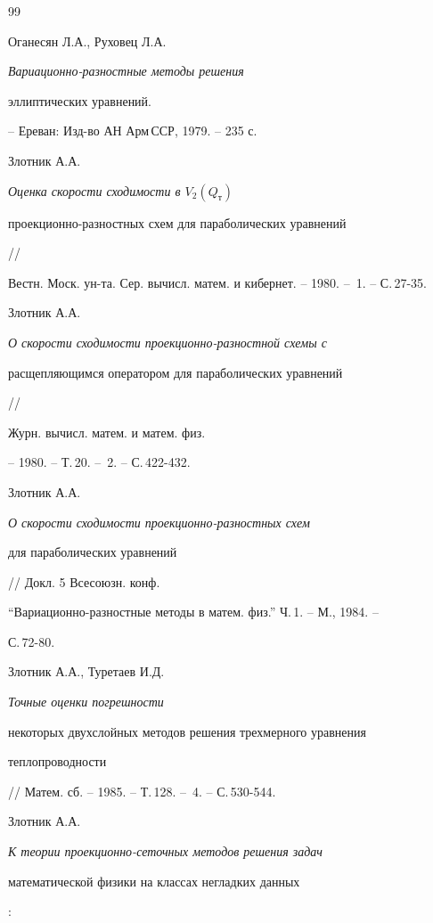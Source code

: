 \begin{thebibliography}{99}


Оганесян Л.А., Руховец Л.А. {\em Вариационно-разностные методы решения


эллиптических уравнений.} -- Ереван: Изд-во АН Арм\,ССР, 1979. -- 235 с.







Злотник А.А. {\em Оценка скорости сходимости  в $V_2(Q_{\text{т}})$ 


проекционно-разностных схем для параболических уравнений} //


Вестн. Моск. ун-та. Сер. вычисл. матем. и кибернет. -- 1980. -- \No\,1. -- С.\,27-35.







Злотник А.А. {\em О скорости сходимости проекционно-разностной схемы с


расщепляющимся оператором для параболических уравнений} //


Журн. вычисл. матем. и матем. физ.


-- 1980. -- Т.\,20. -- \No\,2. -- С.\,422-432.







Злотник А.А. {\em О скорости сходимости проекционно-разностных схем


для параболических уравнений} // Докл. 5 Всесоюзн. конф.


``Вариационно-разностные методы  в матем. физ.'' Ч.\,1. -- М., 1984. --


С.\,72-80.







Злотник А.А., Туретаев И.Д. {\em Точные оценки погрешности 


некоторых двухслойных методов решения трехмерного уравнения


теплопроводности} // Матем. сб. -- 1985. -- Т.\,128. -- \No\,4. -- С.\,530-544. 







Злотник А.А. {\em К теории проекционно-сеточных методов решения задач 


математической физики на классах негладких данных}:



\end{thebibliography}
